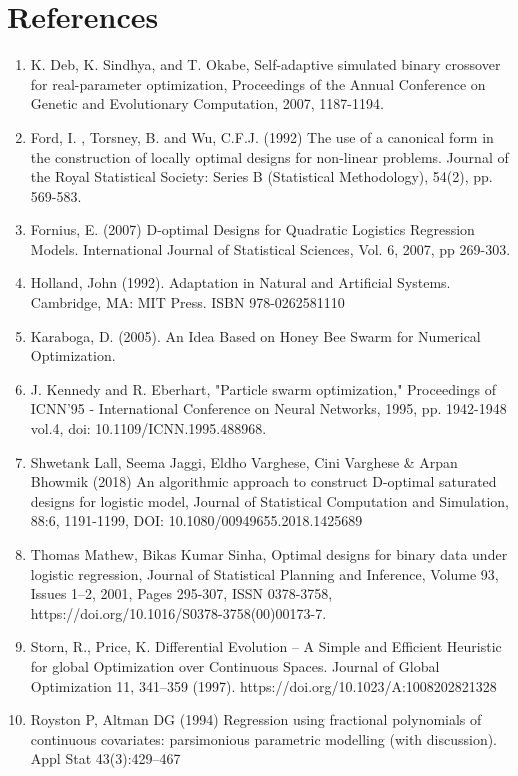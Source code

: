 \documentclass[11pt,a4paper]{article}
\begin{document}
\section{References}
\begin{enumerate}
\item K. Deb, K. Sindhya, and T. Okabe, Self-adaptive simulated binary
crossover for real-parameter optimization, Proceedings of the Annual
Conference on Genetic and Evolutionary Computation, 2007, 1187-1194.

\item Ford, I. , Torsney, B. and Wu, C.F.J. (1992) The use of a canonical form in the construction of locally optimal designs for non-linear problems. Journal of the Royal Statistical Society: Series B (Statistical Methodology), 54(2), pp. 569-583. 
\item Fornius, E. (2007) D-optimal Designs for Quadratic Logistics Regression Models. International Journal of Statistical Sciences, Vol. 6, 2007, pp 269-303.

\item Holland, John (1992). Adaptation in Natural and Artificial Systems. Cambridge, MA: MIT Press. ISBN 978-0262581110
\item Karaboga, D. (2005). An Idea Based on Honey Bee Swarm for Numerical Optimization.
\item J. Kennedy and R. Eberhart, "Particle swarm optimization," Proceedings of ICNN'95 - International Conference on Neural Networks, 1995, pp. 1942-1948 vol.4, doi: 10.1109/ICNN.1995.488968.
\item  Shwetank Lall, Seema Jaggi, Eldho Varghese, Cini Varghese \& Arpan Bhowmik (2018) An algorithmic approach to construct D-optimal saturated designs for logistic model, Journal of Statistical Computation and Simulation, 88:6, 1191-1199, DOI: 10.1080/00949655.2018.1425689 

\item Thomas Mathew, Bikas Kumar Sinha,
Optimal designs for binary data under logistic regression,
Journal of Statistical Planning and Inference,
Volume 93, Issues 1–2,
2001,
Pages 295-307,
ISSN 0378-3758,
https://doi.org/10.1016/S0378-3758(00)00173-7.

\item Storn, R., Price, K. Differential Evolution – A Simple and Efficient Heuristic for global Optimization over Continuous Spaces. Journal of Global Optimization 11, 341–359 (1997). https://doi.org/10.1023/A:1008202821328

\item Royston P, Altman DG (1994) Regression using fractional polynomials of continuous covariates: parsimonious parametric modelling (with discussion). Appl Stat 43(3):429–467


\end{enumerate}
\end{document}

